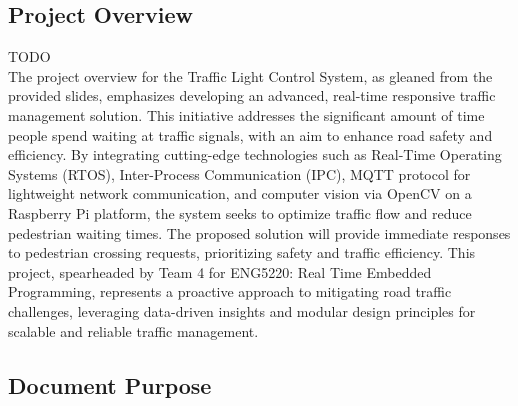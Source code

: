 \subsection{Project Overview}
TODO \\
The project overview for the Traffic Light Control System, as gleaned from the provided slides, emphasizes developing an advanced, real-time responsive traffic management solution. This initiative addresses the significant amount of time people spend waiting at traffic signals, with an aim to enhance road safety and efficiency. By integrating cutting-edge technologies such as Real-Time Operating Systems (RTOS), Inter-Process Communication (IPC), MQTT protocol for lightweight network communication, and computer vision via OpenCV on a Raspberry Pi platform, the system seeks to optimize traffic flow and reduce pedestrian waiting times. The proposed solution will provide immediate responses to pedestrian crossing requests, prioritizing safety and traffic efficiency. This project, spearheaded by Team 4 for ENG5220: Real Time Embedded Programming, represents a proactive approach to mitigating road traffic challenges, leveraging data-driven insights and modular design principles for scalable and reliable traffic management.

\subsection{Document Purpose}
\lipsum[3]
